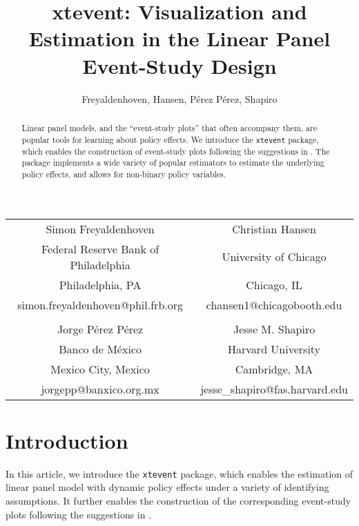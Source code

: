 \documentclass[bib]{./sty/statapress}
\begin{document}
\newcommand{\xtevent}{\texttt{xtevent }}
\newcommand{\xteventplot}{\texttt{xteventplot }}

\author{Freyaldenhoven, Hansen, P\'erez P\'erez, Shapiro}{%
    \begin{tabular}{cc}
    Simon Freyaldenhoven & Christian Hansen \\
     Federal Reserve Bank of Philadelphia & University of Chicago \\
     Philadelphia, PA & Chicago, IL \\
     simon.freyaldenhoven@phil.frb.org & chansen1@chicagobooth.edu \\
     \\
    Jorge P\'erez P\'erez & Jesse M. Shapiro \\
    Banco de México & Harvard University \\
    Mexico City, Mexico & Cambridge, MA \\
    jorgepp@banxico.org.mx & jesse\_shapiro@fas.harvard.edu
    \end{tabular}
}
\title[xtevent]{xtevent: Visualization and Estimation in the Linear Panel Event-Study Design}
\maketitle

\begin{abstract}
Linear panel models, and the “event-study plots” that often accompany them, are popular tools for learning about policy effects. We introduce the \texttt{xtevent} package, which enables the construction of event-study plots following the suggestions in \cite{freyaldenhoven2021visualization}. The package implements a wide variety of popular estimators to estimate the underlying policy effects, and allows for non-binary policy variables.

\end{abstract}


\section{Introduction}
\label{sec:intro}
In this article, we introduce the \texttt{xtevent} package, which enables the estimation of linear panel model with dynamic policy effects under a variety of identifying assumptions. It further enables the construction of the corresponding event-study plots following the suggestions in \cite{freyaldenhoven2021visualization}.
\end{document}
